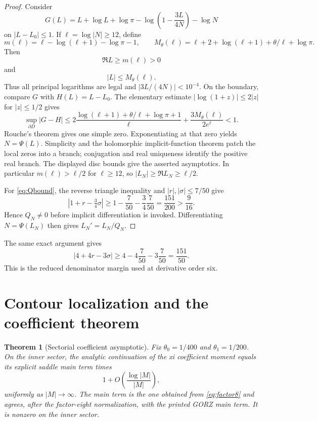 \documentclass[11pt]{article}
\newtheorem{theorem}{Theorem}[section]
\theoremstyle{definition}
\theoremstyle{remark}
\begin{document}
\begin{proof}
Consider
\[
 G(L)=L+\log L+\log\pi-
       \log\left(1-\frac{3L}{4N}\right)-\log N
\]
on $|L-L_0|\le1$.  If $\ell=\log|N|\ge12$, define
\[
 m(\ell)=\ell-\log(\ell+1)-\log\pi-1,
 \qquad
 M_\theta(\ell)=\ell+2+\log(\ell+1)+\theta/\ell+\log\pi.
\]
Then
\[
 \Re L\ge m(\ell)>0
\]
and
\[
 |L|\le M_\theta(\ell).
\]
Thus all principal logarithms are legal and
$|3L/(4N)|<10^{-4}$.  On the boundary, compare $G$ with
$H(L)=L-L_0$.  The elementary estimate $|\log(1+z)|\le2|z|$ for
$|z|\le1/2$ gives
\[
 \sup_{\partial D}|G-H|
 \le 2\frac{\log(\ell+1)+\theta/\ell+\log\pi+1}{\ell}
   +\frac{3M_\theta(\ell)}{2e^\ell}<1.
\]
Rouche's theorem gives one simple zero.  Exponentiating at that zero yields
$N=\Psi(L)$.  Simplicity and the holomorphic implicit-function theorem patch
the local zeros into a branch; conjugation and real uniqueness identify the
positive real branch.  The displayed disc bounds give the asserted
asymptotics.  In particular $m(\ell)>\ell/2$ for $\ell\ge12$, so
$|L_N|\ge\Re L_N\ge\ell/2$.

For \eqref{eq:Qbound}, the reverse triangle inequality and
$|r|,|\sigma|\le7/50$ give
\[
 |1+r-\tfrac34\sigma|
 \ge1-\frac7{50}-\frac34\frac7{50}
 =\frac{151}{200}>\frac9{16}.
\]
Hence $Q_N\ne0$ before implicit differentiation is invoked.  Differentiating
$N=\Psi(L_N)$ then gives $L_N'=L_N/Q_N$.
\end{proof}

The same exact argument gives
\begin{equation}\label{eq:reducedden}
 |4+4r-3\sigma|\ge4-4\frac7{50}-3\frac7{50}=\frac{151}{50}.
\end{equation}
This is the reduced denominator margin used at derivative order six.

\section{Contour localization and the coefficient theorem}\label{sec:coefficient}

\begin{theorem}[Sectorial coefficient asymptotic]\label{thm:sector}
Fix $\theta_0=1/400$ and $\theta_1=1/200$.  On the inner sector, the analytic
continuation of the xi coefficient moment equals its explicit saddle main
term times
\[
                  1+O\left(\frac{\log|M|}{|M|}\right),
\]
uniformly as $|M|\to\infty$.  The main term is the one obtained from
\eqref{eq:factor8} and agrees, after the factor-eight normalization, with the
printed GORZ main term.  It is nonzero on the inner sector.
\end{theorem}
\end{document}
